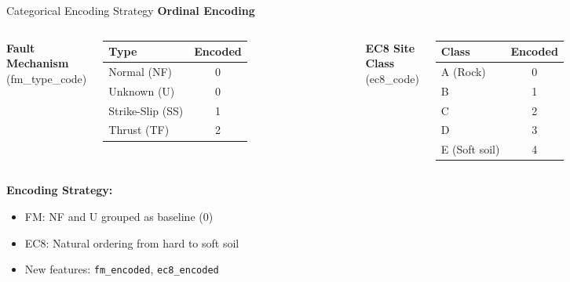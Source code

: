 \documentclass[aspectratio=169,11pt]{beamer}
\begin{document}
\begin{frame}{Categorical Encoding Strategy}
\textbf{Ordinal Encoding}

\vspace{0.3cm}
\begin{columns}[T]
\textbf{Fault Mechanism} (fm\_type\_code)
\begin{table}
\centering
\small
\begin{tabular}{@{}lc@{}}
\toprule
\textbf{Type} & \textbf{Encoded} \\
\midrule
Normal (NF) & 0 \\
Unknown (U) & 0 \\
Strike-Slip (SS) & 1 \\
Thrust (TF) & 2 \\
\bottomrule
\end{tabular}
\end{table}

\textbf{EC8 Site Class} (ec8\_code)
\begin{table}
\centering
\small
\begin{tabular}{@{}lc@{}}
\toprule
\textbf{Class} & \textbf{Encoded} \\
\midrule
A (Rock) & 0 \\
B & 1 \\
C & 2 \\
D & 3 \\
E (Soft soil) & 4 \\
\bottomrule
\end{tabular}
\end{table}
\end{columns}

\vspace{0.3cm}
\textbf{Encoding Strategy:}
\begin{itemize}
    \item FM: NF and U grouped as baseline (0)
    \item EC8: Natural ordering from hard to soft soil
    \item New features: \texttt{fm\_encoded}, \texttt{ec8\_encoded}
\end{itemize}
\end{frame}
\end{document}
